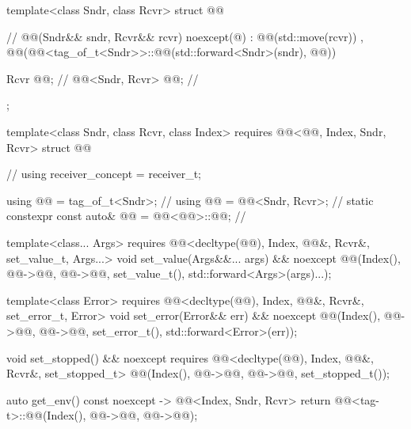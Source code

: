 \begin{codeblock}
{  template<class Sndr, class Rcvr>
  struct @@ {                                          // \expos
    @@(Sndr&& sndr, Rcvr&& rcvr) noexcept(@\seebelow@)
      : @@(std::move(rcvr))
      , @@(@@<tag_of_t<Sndr>>::@@(std::forward<Sndr>(sndr), @@)) { }

    Rcvr @@;                                                  // \expos
    @@<Sndr, Rcvr> @@;                               // \expos
  };

  template<class Sndr, class Rcvr, class Index>
    requires @@<@@, Index, Sndr, Rcvr>
  struct @@ {                                       // \expos
    using receiver_concept = receiver_t;

    using @@ = tag_of_t<Sndr>;                               // \expos
    using @@ = @@<Sndr, Rcvr>;                     // \expos
    static constexpr const auto& @@ = @@<@@>::@@;         // \expos

    template<class... Args>
      requires @@<decltype(@@), Index, @@&, Rcvr&, set_value_t, Args...>
    void set_value(Args&&... args) && noexcept {
      @@(Index(), @@->@@, @@->@@, set_value_t(), std::forward<Args>(args)...);
    }

    template<class Error>
      requires @@<decltype(@@), Index, @@&, Rcvr&, set_error_t, Error>
    void set_error(Error&& err) && noexcept {
      @@(Index(), @@->@@, @@->@@, set_error_t(), std::forward<Error>(err));
    }

    void set_stopped() && noexcept
      requires @@<decltype(@@), Index, @@&, Rcvr&, set_stopped_t> {
      @@(Index(), @@->@@, @@->@@, set_stopped_t());
    }

    auto get_env() const noexcept -> @@<Index, Sndr, Rcvr> {
      return @@<tag-t>::@@(Index(), @@->@@, @@->@@);
    }

}}
\end{codeblock}
